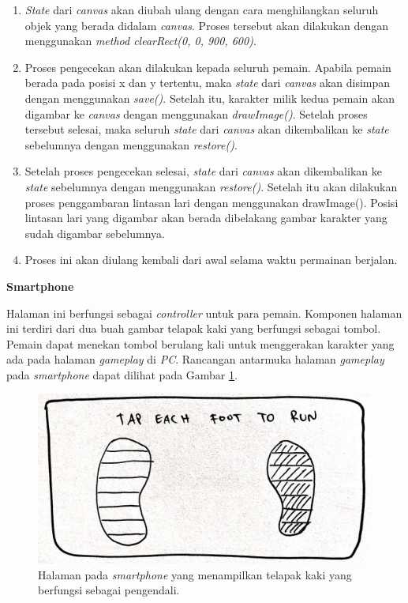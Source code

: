 \begin{enumerate}
\begin{enumerate}
		\item \textit{State} dari \textit{canvas} akan diubah ulang dengan cara menghilangkan seluruh objek yang berada didalam \textit{canvas}. Proses tersebut akan dilakukan dengan menggunakan \textit{method clearRect(0, 0, 900, 600)}.
		
		\item Proses pengecekan akan dilakukan kepada seluruh pemain. Apabila pemain berada pada posisi x dan y tertentu, maka \textit{state} dari \textit{canvas} akan disimpan dengan menggunakan \textit{save()}. Setelah itu, karakter milik kedua pemain akan digambar ke \textit{canvas} dengan menggunakan \textit{drawImage()}. Setelah proses tersebut selesai, maka seluruh \textit{state} dari \textit{canvas} akan dikembalikan ke \textit{state} sebelumnya dengan menggunakan \textit{restore()}.
		
		\item Setelah proses pengecekan selesai, \textit{state} dari \textit{canvas} akan dikembalikan ke \textit{state} sebelumnya dengan menggunakan \textit{restore()}. Setelah itu akan dilakukan proses penggambaran lintasan lari dengan menggunakan drawImage(). Posisi lintasan lari yang digambar akan berada dibelakang gambar karakter yang sudah digambar sebelumnya. 
		
		\item Proses ini akan diulang kembali dari awal selama waktu permainan berjalan.
	\end{enumerate}

	\textbf{Smartphone}
	
	Halaman ini berfungsi sebagai \textit{controller} untuk para pemain. Komponen halaman ini terdiri dari dua buah gambar telapak kaki yang berfungsi sebagai tombol. Pemain dapat menekan tombol berulang kali untuk menggerakan karakter yang ada pada halaman \textit{gameplay} di \textit{PC}. Rancangan antarmuka halaman \textit{gameplay} pada \textit{smartphone} dapat dilihat pada Gambar \ref{fig:mob5_play}.
	
\begin{figure}[H]
	\centering
	\includegraphics[scale=0.1]{Gambar/mob5_play}
	\caption{Halaman pada \textit{smartphone} yang menampilkan telapak kaki yang berfungsi sebagai pengendali.}
	\label{fig:mob5_play}
\end{figure}


\end{enumerate}
